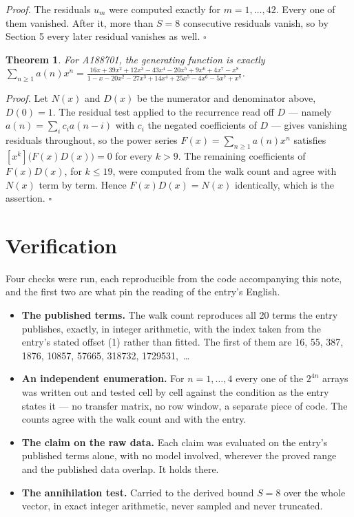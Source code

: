 \documentclass[11pt]{article}
\newtheorem{theorem}{Theorem}
\theoremstyle{definition}
\begin{document}
{\itshape Proof.} The residuals $u_m$ were computed exactly for $m = 1,\dots,42$. Every one of them vanished. After it, more than $S = 8$ consecutive residuals vanish, so by Section 5 every later residual vanishes as well. $\square$

\begin{theorem} For A188701, the generating function is exactly $\sum_{n\ge 1} a(n)x^n = \frac{16x + 39x^{2} + 12x^{3} - 43x^{4} - 20x^{5} + 9x^{6} + 4x^{7} - x^{8}}{1 - x - 20x^{2} - 27x^{3} + 14x^{4} + 25x^{5} - 4x^{6} - 5x^{7} + x^{8}}$.\end{theorem}

{\itshape Proof.} Let $N(x)$ and $D(x)$ be the numerator and denominator above, $D(0)=1$. The residual test applied to the recurrence read off $D$ --- namely $a(n) = \sum_i c_i a(n-i)$ with $c_i$ the negated coefficients of $D$ --- gives vanishing residuals throughout, so the power series $F(x)=\sum_{n\ge 1}a(n)x^n$ satisfies $[x^k]\bigl(F(x)D(x)\bigr) = 0$ for every $k > 9$. The remaining coefficients of $F(x)D(x)$, for $k \le 19$, were computed from the walk count and agree with $N(x)$ term by term. Hence $F(x)D(x) = N(x)$ identically, which is the assertion. $\square$

\section{Verification}

Four checks were run, each reproducible from the code accompanying this note, and the first two are what pin the reading of the entry's English.

\begin{itemize}

\item {\bfseries The published terms.} The walk count reproduces all 20 terms the entry publishes, exactly, in integer arithmetic, with the index taken from the entry's stated offset (1) rather than fitted. The first of them are 16, 55, 387, 1876, 10857, 57665, 318732, 1729531,~\dots

\item {\bfseries An independent enumeration.} For $n = 1,\dots,4$ every one of the $2^{4n}$ arrays was written out and tested cell by cell against the condition as the entry states it --- no transfer matrix, no row window, a separate piece of code. The counts agree with the walk count and with the entry.

\item {\bfseries The claim on the raw data.} Each claim was evaluated on the entry's published terms alone, with no model involved, wherever the proved range and the published data overlap. It holds there.

\item {\bfseries The annihilation test.} Carried to the derived bound $S = 8$ over the whole vector, in exact integer arithmetic, never sampled and never truncated.

\end{itemize}
\end{document}
